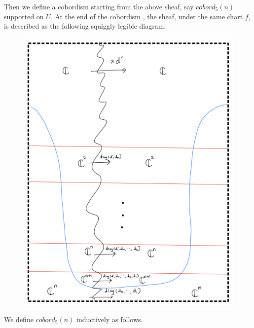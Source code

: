 Then we define a cobordism starting from the above sheaf, say $cobord_5(n)$ supported on $U$. At the end of the cobordism , the sheaf, under the same chart $f$, is described as the following squiggly legible diagram. 

\begin{figure}[H]
    \centering
    \includegraphics[scale = 0.95]{diagrams/cobord5/7.png} 
    \caption{}
    \label{fig:your-label}
\end{figure}
\pagebreak 
We define $cobord_5(n)$ inductively as follows.
